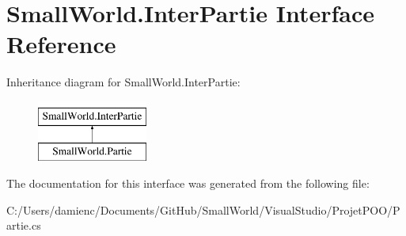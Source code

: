 \hypertarget{interface_small_world_1_1_inter_partie}{\section{Small\-World.\-Inter\-Partie Interface Reference}
\label{interface_small_world_1_1_inter_partie}
}
Inheritance diagram for Small\-World.\-Inter\-Partie\-:\begin{figure}[H]
\begin{center}
\leavevmode
\includegraphics[height=2.000000cm]{interface_small_world_1_1_inter_partie}
\end{center}
\end{figure}


The documentation for this interface was generated from the following file\-:\begin{DoxyCompactItemize}
\item 
C\-:/\-Users/damienc/\-Documents/\-Git\-Hub/\-Small\-World/\-Visual\-Studio/\-Projet\-P\-O\-O/Partie.\-cs\end{DoxyCompactItemize}
